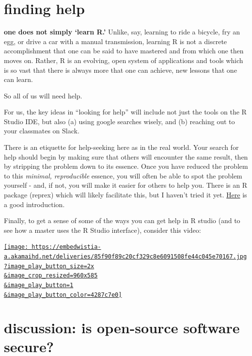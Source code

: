 \documentclass[openany]{book}
\begin{document}
\hypertarget{finding-help}{%
\section{finding help}\label{finding-help}}

\textbf{one does not simply `learn R.'} Unlike, say, learning to ride a bicycle, fry an egg, or drive a car with a manual transmission, learning R is not a discrete accomplishment that one can be said to have mastered and from which one then moves on. Rather, R is an evolving, open system of applications and tools which is so vast that there is always more that one can achieve, new lessons that one can learn.

So all of us will need help.

For us, the key ideas in ``looking for help'' will include not just the tools on the R Studio IDE, but also (a) using google searches wisely, and (b) reaching out to your classmates on Slack.

There is an etiquette for help-seeking here as in the real world. Your search for help should begin by making sure that others will encounter the same result, then by stripping the problem down to its essence. Once you have reduced the problem to this \emph{minimal, reproducible} essence, you will often be able to spot the problem yourself - and, if not, you will make it easier for others to help you. There is an R package (reprex) which will likely facilitate this, but I haven't tried it yet. \href{https://www.tidyverse.org/help/}{Here} is a good introduction.

Finally, to get a sense of some of the ways you can get help in R studio (and to see how a master uses the R Studio interface), consider this video:

\href{https://www.rstudio.com/resources/webinars/rstudio-essentials-webinar-series-part-1/?wvideo=k8kz4e0p2v}{\texttt{[image: https://embedwistia-a.akamaihd.net/deliveries/85f90f89c20cf329c8e6091508fe44c045e70167.jpg?image\_play\_button\_size=2x\\\&image\_crop\_resized=960x585\\\&image\_play\_button=1\\\&image\_play\_button\_color=4287c7e0]}}

\hypertarget{discussion-is-open-source-software-secure}{%
\section{discussion: is open-source software secure?}\label{discussion-is-open-source-software-secure}}
\end{document}
